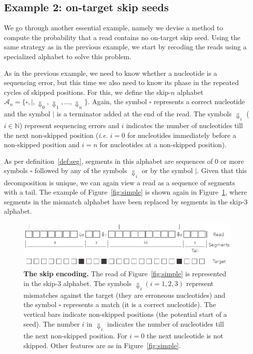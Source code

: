 \documentclass{article}
\begin{document}
\subsection{Example 2: on-target skip seeds}
\label{sec:example_skip}

We go through another essential example, namely we devise a method to
compute the probability that a read contains no on-target skip seed. Using
the same strategy as in the previous example, we start by recoding the
reads using a specialized alphabet to solve this problem.

As in the previous example, we need to know whether a nucleotide is a
sequencing error, but this time we also need to know its phase in the
repeated cycles of skipped positions. For this, we define the skip-$n$
alphabet $\mathcal{A}_n = \{\square, |, \Downarrow_0, \Downarrow_1,
\ldots, \Downarrow_n \}$. Again, the symbol $\square$ represents a correct
nucleotide and the symbol $|$ is a terminator added at the end of the
read. The symbols $\Downarrow_i$ ($i \in \mathbb{N}$) represent sequencing
errors and $i$ indicates the number of nucleotides till the next
non-skipped position (\textit{i.e.} $i=0$ for nucleotides immediately
before a non-skipped position and $i=n$ for nucleotides at a non-skipped
position).

As per definition~\ref{def:seg}, segments in this alphabet are sequences
of 0 or more symbols $\square$ followed by any of the symbols
$\Downarrow_i$ or by the symbol $|$. Given that this decomposition is
unique, we can again view a read as a sequence of segments with a tail.
The example of Figure~\ref{fig:simple} is shown again in
Figure~\ref{fig:skip}, where segments in the mismatch alphabet have been
replaced by segments in the skip-3 alphabet.

\begin{figure}[h]
\centering
\includegraphics[scale=0.85]{sketch_skip.pdf}
\caption{\textbf{The skip encoding.}
The read of Figure~\ref{fig:simple} is represented in the skip-3 alphabet.
The symbols $\Downarrow_i (i = 1,2,3)$ represent mismatches against the
target (they are erroneous nucleotides) and the symbol $\square$
represents a match (it is a correct nucleotide). The vertical bars
indicate non-skipped positions (the potential start of a seed). The number
$i$ in $\Downarrow_i$ indicates the number of nucleotides till the next
non-skipped position. For $i=0$ the next nucleotide is not skipped.
Other features are as in Figure~\ref{fig:simple}.}
\label{fig:skip}
\end{figure}
\end{document}

